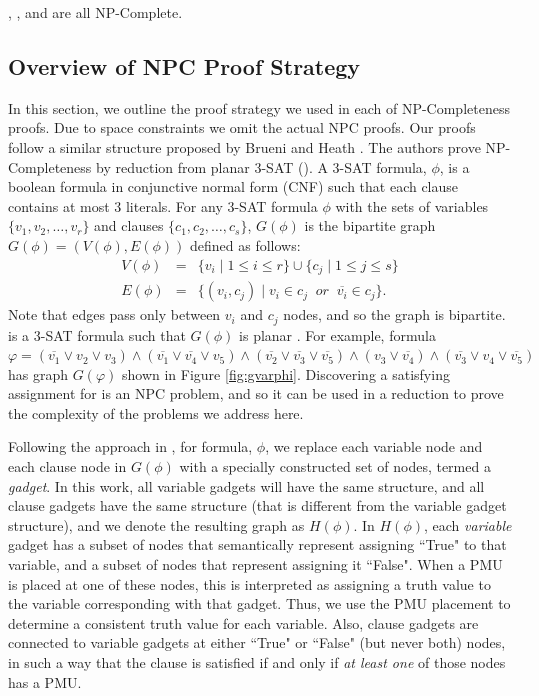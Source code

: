 \begin{theorem}
\maxincs, \xvalparts, \full and \xval are all NP-Complete.
\label{thm:pmu-npc}
\end{theorem}



\subsection{Overview of NPC Proof Strategy}
\label{subsec:proofstrat}
In this section, we outline the proof strategy we used in each of NP-Completeness proofs.  Due to space constraints we omit the actual NPC proofs. 
Our proofs follow a similar structure proposed by Brueni and Heath \cite{Brueni05}. The authors prove NP-Completeness by reduction from planar 3-SAT (\sats).
A 3-SAT formula, $\phi$, is a boolean formula in conjunctive normal form (CNF) such 
that each clause contains at most $3$ literals. For any 3-SAT formula $\phi$ with the sets of variables $\{v_1,v_2, \dots , v_r\}$ and clauses $\{c_1,c_2, \dots , c_s \}$, $G(\phi)$ 
is the bipartite graph $G(\phi)=(V(\phi),E(\phi))$ defined as follows:
\begin{eqnarray*}
 V(\phi) &= &\{v_i\; \vert\; 1 \leq i \leq r \} \cup \{c_j \;\vert\; 1 \leq j \leq s \} \\
 E(\phi) &=& \{ (v_i,c_j)\;\vert\; v_i \in c_j\;\; or \;\; \overline{v_i} \in c_j\}.
\end{eqnarray*}
Note that edges pass only between $v_i$ and $c_j$ nodes, and so the graph is bipartite.  \sat is a 3-SAT formula such that $G(\phi)$ is planar \cite{Lich82}. 
For example, \sat formula
	 $\varphi = (\overline{v_1} \vee v_2 \vee v_3) \wedge (\overline{v_1} \vee \overline{v_4} \vee v_5) \wedge (\overline{v_2} \vee \overline{v_3} \vee \overline{v_5}) 
	 \wedge (v_3 \vee \overline{v_4}) \wedge  (\overline{v_3} \vee v_4 \vee \overline{v_5})$
has graph $G(\varphi)$ shown in Figure \ref{fig:gvarphi}. 
Discovering a satisfying assignment for  \sat is an NPC problem, and so it can be used in a reduction to prove the complexity of the problems we address here. 

Following the approach in \cite{Brueni05}, for \sat formula, $\phi$, we replace each variable node and each clause node in $G(\phi)$ with a specially constructed set of nodes,
termed a {\em gadget}. In this work, all variable gadgets will have the same structure, and all clause gadgets have the same structure (that is different from the variable gadget structure), 
and we denote the resulting graph as $H(\phi)$. In $H(\phi)$, each {\em variable} gadget has a subset of nodes that semantically represent assigning ``True" to that variable, and a subset of 
nodes that represent assigning it ``False". When a PMU is placed at one of these nodes, this is interpreted as assigning a truth value to the \sat variable corresponding with that gadget. 
Thus, we use the PMU placement to determine a consistent truth value for each \sat variable. Also, clause gadgets are connected to variable gadgets at either ``True" or ``False" (but never both) 
nodes, in such a way that the clause is satisfied if and only if {\em at least one} of those nodes has a PMU.

